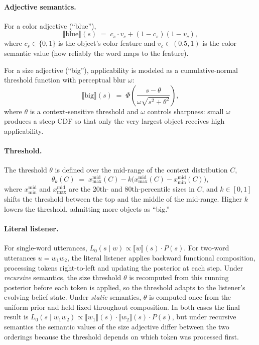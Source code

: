 \paragraph{Adjective semantics.}
For a color adjective (``blue''),
\begin{equation}
  \llbracket \text{blue} \rrbracket(s) \;=\;
  c_s \cdot v_c + (1 - c_s)(1 - v_c),
\end{equation}
where $c_s \in \{0,1\}$ is the object's color feature and
$v_c \in (0.5, 1)$ is the color semantic value (how reliably the word
maps to the feature).

For a size adjective (``big''), applicability is modeled as a
cumulative-normal threshold function with perceptual blur $\omega$:
\begin{equation}
  \llbracket \text{big} \rrbracket(s) \;=\;
  \Phi\!\left(\frac{s - \theta}{\omega\sqrt{s^2 + \theta^2}}\right),
\end{equation}
where $\theta$ is a context-sensitive threshold and
$\omega$ controls sharpness: small $\omega$ produces a steep CDF
so that only the very largest object receives high applicability.

\paragraph{Threshold.}
The threshold $\theta$ is defined over the mid-range of the context
distribution $C$,
\begin{equation}
  \theta_k(C) \;=\;
  x_{\max}^{\text{mid}}(C) - k\bigl(x_{\max}^{\text{mid}}(C) - x_{\min}^{\text{mid}}(C)\bigr),
\end{equation}
where $x_{\min}^{\text{mid}}$ and $x_{\max}^{\text{mid}}$ are the
20th- and 80th-percentile sizes in $C$, and $k \in [0,1]$ shifts
the threshold between the top and the middle of the mid-range.
Higher $k$ lowers the threshold, admitting more objects as ``big.''

\paragraph{Literal listener.}
For single-word utterances,
$L_0(s \mid w) \propto \llbracket w \rrbracket(s) \cdot P(s)$.
For two-word utterances $u = w_1 w_2$, the literal listener applies
backward functional composition, processing tokens right-to-left and
updating the posterior at each step.
Under \textit{recursive} semantics, the size threshold $\theta$ is
recomputed from this running posterior before each token is applied, so the
threshold adapts to the listener's evolving belief state.
Under \textit{static} semantics, $\theta$ is computed once from the uniform
prior and held fixed throughout composition.
In both cases the final result is
$L_0(s \mid w_1 w_2) \propto
  \llbracket w_1 \rrbracket(s) \cdot \llbracket w_2 \rrbracket(s) \cdot P(s)$,
but under recursive semantics the semantic values of the size adjective
differ between the two orderings because the threshold depends on which
token was processed first.

